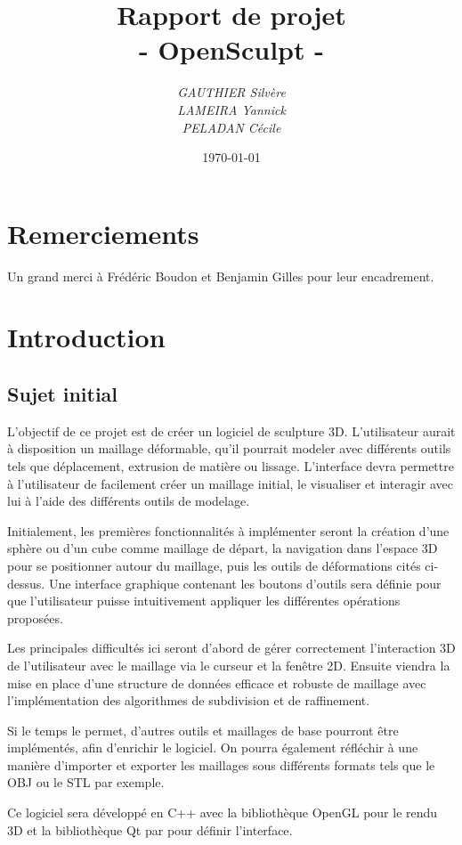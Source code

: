 \documentclass[a4paper]{memoir}
\title{\textbf{Rapport de projet}\\- \Huge{OpenSculpt} -}
\author{\emph{GAUTHIER Silvère}\\\emph{LAMEIRA Yannick}\\\emph{PELADAN Cécile}}
\date{\today}
\begin{document}
	\maketitle
	\newpage
	\tableofcontents

	\chapter{Remerciements}

		Un grand merci à Frédéric Boudon et Benjamin Gilles pour leur encadrement.

	\chapter{Introduction}
		
		\section{Sujet initial}
				L'objectif de ce projet est de créer un logiciel de sculpture 3D. L'utilisateur aurait à disposition un maillage déformable, qu'il pourrait modeler avec différents outils tels que déplacement, extrusion de matière ou lissage. L'interface devra permettre à l'utilisateur de facilement créer un maillage initial, le visualiser et interagir avec lui à l'aide des différents outils de modelage.

	Initialement, les premières fonctionnalités à implémenter seront la création d'une sphère ou
d'un cube comme maillage de départ, la navigation dans l'espace 3D pour se positionner autour du maillage, puis les outils de déformations cités ci-dessus. Une interface graphique contenant les
boutons d'outils sera définie pour que l'utilisateur puisse intuitivement appliquer les différentes opérations proposées.

	Les principales difficultés ici seront d'abord de gérer correctement l'interaction 3D de l'utilisateur avec le maillage via le curseur et la fenêtre 2D. Ensuite viendra la mise en place d'une structure de données efficace et robuste de maillage avec l'implémentation des algorithmes de subdivision et de raffinement.

	Si le temps le permet, d'autres outils et maillages de base pourront être implémentés, afin
d'enrichir le logiciel. On pourra également réfléchir à une manière d'importer et exporter les
maillages sous différents formats tels que le OBJ ou le STL par exemple.

	Ce logiciel sera développé en C++ avec la bibliothèque OpenGL pour le rendu 3D et la bibliothèque Qt par pour définir l'interface.
	
\end{document}

